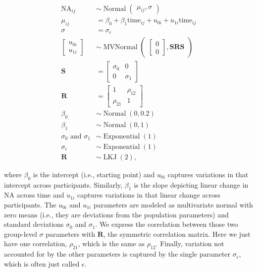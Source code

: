 \documentclass[]{article}
\begin{document}
\[
\begin{align*}
\text{NA}_{ij} & \sim \operatorname{Normal}\begin{pmatrix} \mu_{ij}, \sigma \end{pmatrix} \\
\mu_{ij}       & = \beta_0 + \beta_1 \text{time}_{ij} + u_{0i} + u_{1i} \text{time}_{ij} \\
\sigma & = \sigma_\epsilon \\
\begin{bmatrix} u_{0i} \\ u_{1i} \end{bmatrix} & \sim \operatorname{MVNormal}\begin{pmatrix} \begin{bmatrix} 0 \\ 0 \end{bmatrix}, \mathbf S \mathbf R \mathbf S \end{pmatrix} \\
\mathbf S & = \begin{bmatrix} \sigma_0 & 0 \\ 0 & \sigma_1 \end{bmatrix} \\
\mathbf R & = \begin{bmatrix} 1 & \rho_{12} \\ \rho_{21} & 1 \end{bmatrix} \\
\beta_0   & \sim \operatorname{Normal}(0, 0.2) \\
\beta_1   & \sim \operatorname{Normal}(0, 1) \\
\sigma_0 \text{ and } \sigma_1 & \sim \operatorname{Exponential}(1) \\
\sigma_\epsilon & \sim \operatorname{Exponential}(1) \\
\mathbf R & \sim \operatorname{LKJ}(2),
\end{align*}
\]

where \(\beta_0\) is the intercept (i.e., starting point) and \(u_{0i}\)
captures variations in that intercept across participants. Similarly,
\(\beta_1\) is the slope depicting linear change in \(\text{NA}\) across
time and \(u_{1i}\) captures variations in that linear change across
participants. The \(u_{0i}\) and \(u_{1i}\) parameters are modeled as
multivariate normal with zero means (i.e., they are deviations from the
population parameters) and standard deviations \(\sigma_0\) and
\(\sigma_1\). We express the correlation between those two group-level
\(\sigma\) parameters with \(\mathbf R\), the symmetric correlation
matrix. Here we just have one correlation, \(\rho_{21}\), which is the
same as \(\rho_{12}\). Finally, variation not accounted for by the other
parameters is captured by the single parameter \(\sigma_\epsilon\),
which is often just called \(\epsilon\).
\end{document}
